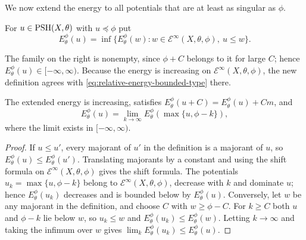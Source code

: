 We now extend the energy to all potentials that are at least as singular as $\phi$.

\begin{definition}\label{def:extended-relative-energy}
For $u\in\mathrm{PSH}(X,\theta)$ with $u\preceq\phi$ put
\[
 E_\theta^\phi(u)=\inf\{E_\theta^\phi(w):w\in\mathcal E^\infty(X,\theta,\phi),\ u\leq w\}.
\]
\end{definition}
The family on the right is nonempty, since $\phi+C$ belongs to it for large $C$; hence $E_\theta^\phi(u)\in[-\infty,\infty)$. Because the energy is increasing on $\mathcal E^\infty(X,\theta,\phi)$, the new definition agrees with \eqref{eq:relative-energy-bounded-type} there.

\begin{proposition}\label{prop:relative-energy-canonical-truncations}
The extended energy is increasing, satisfies $E_\theta^\phi(u+C)=E_\theta^\phi(u)+Cm$, and
\[
 E_\theta^\phi(u)=\lim_{k\to\infty}
                       E_\theta^\phi(\max\{u,\phi-k\}),
\]
where the limit exists in $[-\infty,\infty)$.
\end{proposition}
\begin{proof}
If $u\leq u'$, every majorant of $u'$ in the definition is a majorant of $u$, so $E_\theta^\phi(u)\leq E_\theta^\phi(u')$. Translating majorants by a constant and using the shift formula on $\mathcal E^\infty(X,\theta,\phi)$ gives the shift formula. The potentials $u_k=\max\{u,\phi-k\}$ belong to $\mathcal E^\infty(X,\theta,\phi)$, decrease with $k$ and dominate $u$; hence $E_\theta^\phi(u_k)$ decreases and is bounded below by $E_\theta^\phi(u)$. Conversely, let $w$ be any majorant in the definition, and choose $C$ with $w\geq\phi-C$. For $k\geq C$ both $u$ and $\phi-k$ lie below $w$, so $u_k\leq w$ and $E_\theta^\phi(u_k)\leq E_\theta^\phi(w)$. Letting $k\to\infty$ and taking the infimum over $w$ gives $\lim_kE_\theta^\phi(u_k)\leq E_\theta^\phi(u)$.
\end{proof}

